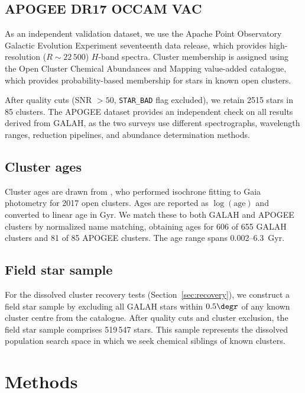 \documentclass[fleqn,usenatbib]{mnras}
\begin{document}
\subsection{APOGEE DR17 OCCAM VAC}
\label{sec:apogee}

As an independent validation dataset, we use the Apache Point Observatory Galactic Evolution Experiment \citep[APOGEE;][]{Abdurrouf2022} seventeenth data release, which provides high-resolution ($R \sim 22\,500$) $H$-band spectra.
Cluster membership is assigned using the Open Cluster Chemical Abundances and Mapping \citep[OCCAM;][]{Donor2020} value-added catalogue, which provides probability-based membership for stars in known open clusters.

After quality cuts (SNR $> 50$, \texttt{STAR\_BAD} flag excluded), we retain 2515 stars in 85 clusters.
The APOGEE dataset provides an independent check on all results derived from GALAH, as the two surveys use different spectrographs, wavelength ranges, reduction pipelines, and abundance determination methods.

\subsection{Cluster ages}
\label{sec:ages}

Cluster ages are drawn from \citet{CantatGaudin2020}, who performed isochrone fitting to Gaia photometry for 2017 open clusters.
Ages are reported as $\log(\mathrm{age})$ and converted to linear age in Gyr.
We match these to both GALAH and APOGEE clusters by normalized name matching, obtaining ages for 606 of 655 GALAH clusters and 81 of 85 APOGEE clusters.
The age range spans 0.002--6.3~Gyr.

\subsection{Field star sample}
\label{sec:field}

For the dissolved cluster recovery tests (Section~\ref{sec:recovery}), we construct a field star sample by excluding all GALAH stars within $0.5\degr$ of any known cluster centre from the \citet{CantatGaudin2020} catalogue.
After quality cuts and cluster exclusion, the field star sample comprises 519\,547 stars.
This sample represents the dissolved population search space in which we seek chemical siblings of known clusters.


\section{Methods}
\label{sec:methods}
\end{document}
